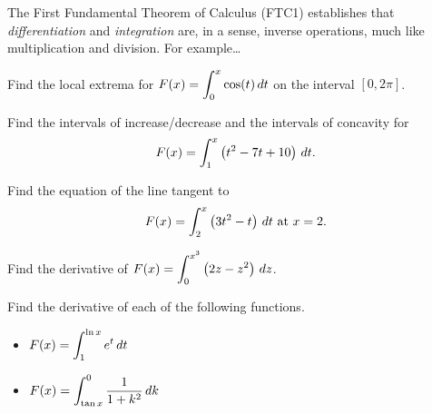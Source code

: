 \documentclass[12pt]{article}
\begin{document}
\vspace{5mm}

The First Fundamental Theorem of Calculus (FTC1) establishes that \textit{differentiation} and \textit{integration} are, in a sense, inverse operations, much like multiplication and division. For example\dots

\newpage

\Example Find the local extrema for $F(x)=\displaystyle\int_0^x\cos(t)\,dt$ on the interval $[0,2\pi]$.

\vspace{50mm}

\Example Find the intervals of increase/decrease and the intervals of concavity for 
$$F(x)=\int_1^x\left( t^2-7t+10\right)\,dt.$$

\vspace{50mm}

\Example Find the equation of the line tangent to
$$F(x)=\int_2^x\left( 3t^2-t\right)\,dt\text{ at }x=2.$$

\newpage


\vspace{3mm}

\Example Find the derivative of $F(x)=\displaystyle\int_0^{x^3}\left( 2z-z^2\right)\,dz$.

\vspace{40mm}

\Example Find the derivative of each of the following functions.

\begin{itemize}
	\item[\tc{1}] $F(x)=\displaystyle\int_1^{\ln x}e^t\,dt$
	
	\vspace{25mm}
	
	\item[\tc{2}] $F(x)=\displaystyle\int_{\tan x}^0\frac{1}{1+k^2}\,dk$
	
	\vspace{25mm}
	
\end{itemize}
\end{document}
